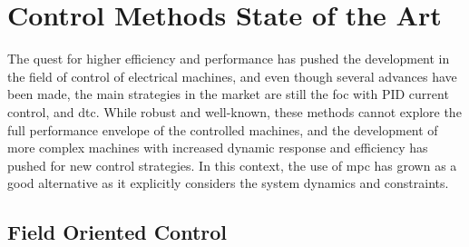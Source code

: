\vfill
\section{Control Methods State of the Art}\label{section:control_methods}
The quest for higher efficiency and performance has pushed the development in the field of control of electrical machines, and even though several advances have been made, the main strategies in the market are still the \gls{foc} with PID current control, and \gls{dtc}. While robust and well-known, these methods cannot explore the full performance envelope of the controlled machines, and the development of more complex machines with increased dynamic response and efficiency has pushed for new control strategies. In this context, the use of \gls{mpc} has grown as a good alternative as it explicitly considers the system dynamics and constraints.

\subsection{Field Oriented Control}

